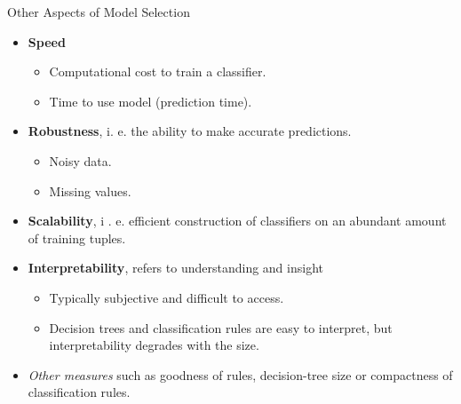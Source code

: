 \begin{frame}{Other Aspects of Model Selection}
	\begin{itemize}
		\item \textbf{Speed}
		      \begin{itemize}
			      \item Computational cost to train a classifier.
			      \item Time to use model (prediction time).
		      \end{itemize}
		\item \textbf{Robustness}, i. e. the ability to make accurate predictions.
		      \begin{itemize}
			      \item Noisy data.
			      \item Missing values.
		      \end{itemize}
		\item \textbf{Scalability}, i . e. efficient construction of classifiers on an abundant amount of training tuples.
		\item \textbf{Interpretability}, refers to understanding and insight
		      \begin{itemize}
			      \item Typically subjective and difficult to access.
			      \item Decision trees and classification rules are easy to interpret, but interpretability degrades with the size.
		      \end{itemize}
		\item \textit{Other measures} such as goodness of rules, decision-tree size or compactness of classification rules.
	\end{itemize}
\end{frame}
